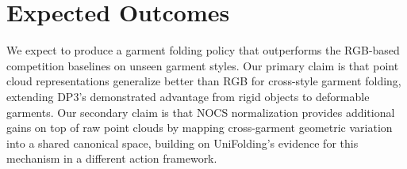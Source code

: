 \section{Expected Outcomes}

We expect to produce a garment folding policy that outperforms the RGB-based competition baselines on unseen garment styles. Our primary claim is that point cloud representations generalize better than RGB for cross-style garment folding, extending DP3's demonstrated advantage from rigid objects to deformable garments. Our secondary claim is that NOCS normalization provides additional gains on top of raw point clouds by mapping cross-garment geometric variation into a shared canonical space, building on UniFolding's evidence for this mechanism in a different action framework.

